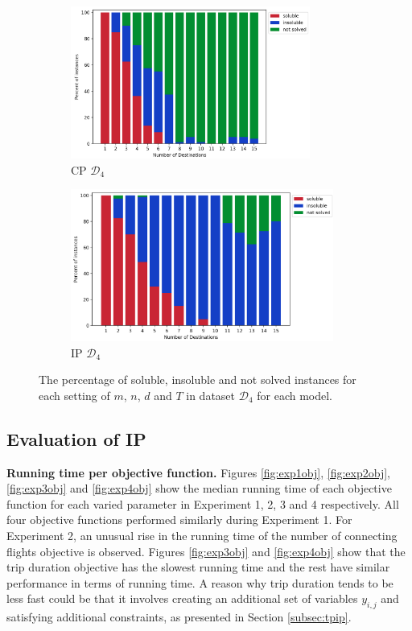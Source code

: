 \documentclass{mpaper}
\begin{document}
\begin{figure}
    \centering
    \begin{subfigure}[b]{0.48\textwidth}
        \includegraphics[width=\textwidth, height=5cm]{cpipexperiments/satunsatnotsolved_cp_d2.png}
        \caption{CP $\mathcal{D}_4$}
        \label{fig:satunsatnotsolved_cp_d2}
    \end{subfigure}
    \begin{subfigure}[b]{0.48\textwidth}
        \includegraphics[width=\textwidth, height=5cm]{cpipexperiments/satunsatnotsolved_ip_d2.png}
        \caption{IP $\mathcal{D}_4$}
        \label{fig:satunsatnotsolved_ip_d2}
    \end{subfigure}
    \caption{The percentage of soluble, insoluble and not solved instances for each setting of $m$, $n$, $d$ and $T$ in dataset $\mathcal{D}_4$ for each model.}
    \label{fig:satunsatnotsolved_cp_ip_d2}
\end{figure}

\subsection{Evaluation of IP}

\textbf{Running time per objective function.} Figures \ref{fig:exp1obj}, \ref{fig:exp2obj}, \ref{fig:exp3obj} and \ref{fig:exp4obj} show the median running time of each objective function for each varied parameter in Experiment 1, 2, 3 and 4 respectively. All four objective functions performed similarly during Experiment 1. For Experiment 2, an unusual rise in the running time of the number of connecting flights objective is observed. Figures \ref{fig:exp3obj} and \ref{fig:exp4obj} show that the trip duration objective has the slowest running time and the rest have similar performance in terms of running time. A reason why trip duration tends to be less fast could be that it involves creating an additional set of variables $y_{i,j}$ and satisfying additional constraints, as presented in Section \ref{subsec:tpip}.
\end{document}

